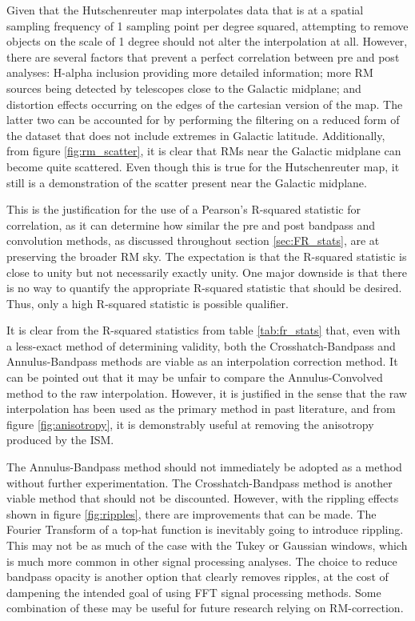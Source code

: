 Given that the Hutschenreuter map interpolates data that is at a spatial sampling frequency of 1 sampling point per degree squared, attempting to remove objects on the scale of 1 degree should not alter the interpolation at all. However, there are several factors that prevent a perfect correlation between pre and post analyses: H-alpha inclusion providing more detailed information; more RM sources being detected by telescopes close to the Galactic midplane; and distortion effects occurring on the edges of the cartesian version of the map. The latter two can be accounted for by performing the filtering on a reduced form of the dataset that does not include extremes in Galactic latitude. Additionally, from figure \ref{fig:rm_scatter}, it is clear that RMs near the Galactic midplane can become quite scattered. Even though this is true for the Hutschenreuter map, it still is a demonstration of the scatter present near the Galactic midplane.


This is the justification for the use of a Pearson's R-squared statistic for correlation, as it can determine how similar the pre and post bandpass and convolution methods, as discussed throughout section \ref{sec:FR_stats}, are at preserving the broader RM sky. The expectation is that the R-squared statistic is close to unity but not necessarily exactly unity. One major downside is that there is no way to quantify the appropriate R-squared statistic that should be desired. Thus, only a high R-squared statistic is possible qualifier.


It is clear from the R-squared statistics from table \ref{tab:fr_stats} that, even with a less-exact method of determining validity, both the Crosshatch-Bandpass and Annulus-Bandpass methods are viable as an interpolation correction method. It can be pointed out that it may be unfair to compare the Annulus-Convolved method to the raw interpolation. However, it is justified in the sense that the raw interpolation has been used as the primary method in past literature, and from figure \ref{fig:anisotropy}, it is demonstrably useful at removing the anisotropy produced by the ISM.


The Annulus-Bandpass method should not immediately be adopted as a method without further experimentation. The Crosshatch-Bandpass method is another viable method that should not be discounted. However, with the rippling effects shown in figure \ref{fig:ripples}, there are improvements that can be made. The Fourier Transform of a top-hat function is inevitably going to introduce rippling. This may not be as much of the case with the Tukey or Gaussian windows, which is much more common in other signal processing analyses. The choice to reduce bandpass opacity is another option that clearly removes ripples, at the cost of dampening the intended goal of using FFT signal processing methods. Some combination of these may be useful for future research relying on RM-correction.


